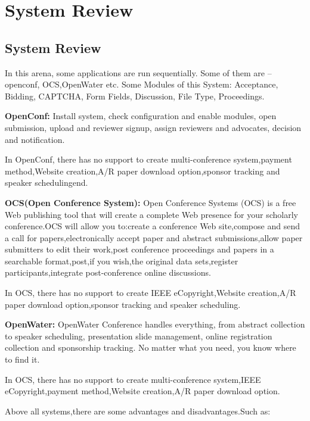 \chapter{System Review}
\section{System Review}

In this arena, some applications are run sequentially. Some of them are – openconf, OCS,OpenWater etc.
Some Modules of this System: Acceptance, Bidding, CAPTCHA, Form Fields, Discussion, File Type, Proceedings.\newline

\textbf{OpenConf:} Install system, check configuration and enable modules, open submission, upload and reviewer signup, assign reviewers and advocates, decision and notification.\newline

In OpenConf, there has no support to create multi-conference system,payment method,Website creation,A/R paper download option,sponsor tracking and speaker schedulingend.

\textbf{OCS(Open Conference System):} Open Conference Systems (OCS) is a free Web publishing tool that will create a complete Web presence for your scholarly conference.OCS will allow you to:create a conference Web site,compose and send a call for papers,electronically accept paper and abstract submissions,allow paper submitters to edit their work,post conference proceedings and papers in a searchable format,post,if you wish,the original data sets,register participants,integrate post-conference online discussions.\newline

In OCS, there has no support to create IEEE eCopyright,Website creation,A/R paper download option,sponsor tracking and speaker scheduling.\newline

\textbf{OpenWater:} OpenWater Conference handles everything, from abstract collection to speaker scheduling, presentation slide management, online registration collection and sponsorship tracking. No matter what you need, you know where to find it.\newline

In OCS, there has no support to create multi-conference system,IEEE eCopyright,payment method,Website creation,A/R paper download option.\newline

Above all systems,there are some advantages and disadvantages.Such as:\newline

